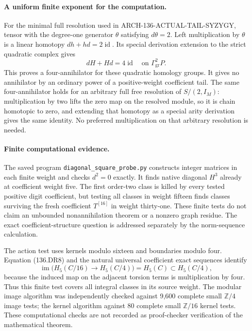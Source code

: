 \paragraph{A uniform finite exponent for the computation.}
For the minimal full resolution used in
ARCH-136-ACTUAL-TAIL-SYZYGY, tensor with the degree-one
generator \(\theta\) satisfying \(d\theta=2\).
Left multiplication by \(\theta\) is a linear homotopy
\(dh+hd=2\operatorname{id}\). Its special derivation
extension to the strict quadratic complex gives
\[
                  dH+Hd=4\operatorname{id}
                         \quad\text{on }\Gamma^2_{\mathrm{gr}}P.
                                                               \tag{136.DR8}
\]
This proves a four-annihilator for these quadratic homology
groups. It gives no annihilator by an ordinary power of a
positive-weight coefficient tail.
The same four-annihilator holds for an arbitrary full free
resolution of \(S/(2,I_M)\): multiplication by two lifts the
zero map on the resolved module, so it is chain homotopic to
zero, and extending that homotopy as a special arity derivation
gives the same identity. No preferred multiplication on that
arbitrary resolution is needed.

\paragraph{Finite computational evidence.}
The saved program \texttt{diagonal\_square\_probe.py} constructs
integer matrices in each finite weight and checks \(d^2=0\)
exactly. It finds native diagonal \(H^3\) already at coefficient
weight five. The first order-two class is killed by every
tested positive digit coefficient, but testing all classes
in weight fifteen finds classes surviving the fresh coefficient
\(T^{[16]}\) in weight thirty-one. These finite tests do not
claim an unbounded nonannihilation theorem or a nonzero graph
residue. The exact coefficient-structure question is addressed
separately by the norm-sequence calculation.

The action test uses kernels modulo sixteen and boundaries
modulo four. Equation (136.DR8) and the natural universal
coefficient exact sequences identify
\[
 \operatorname{im}\bigl(H_5(C/16)\to H_5(C/4)\bigr)
                          =H_5(C)\subset H_5(C/4),      \tag{136.DR9}
\]
because the induced map on the adjacent torsion terms is
multiplication by four. Thus this finite test covers all
integral classes in its source weight. The modular image
algorithm was independently checked against 9,600 complete
small \(\mathbb Z/4\) image tests; the kernel algorithm
against 80 complete small \(\mathbb Z/16\) kernel tests.
These computational checks are not recorded as proof-checker
verification of the mathematical theorem.


